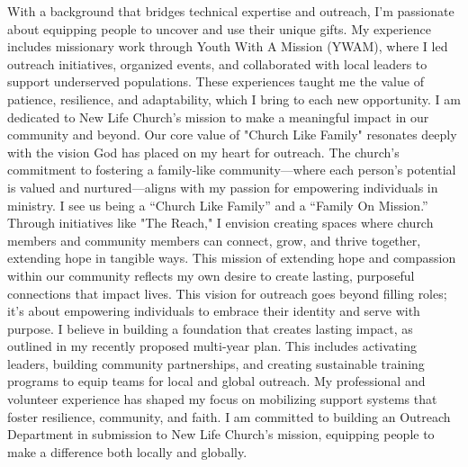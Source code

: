 \documentclass[11pt, a4paper]{awesome-cv}
\begin{document}
\makecvheader[C]


\makelettertitle

\begin{cvletter}
With a background that bridges technical expertise and outreach, I’m passionate about equipping people to uncover and use their unique gifts. My experience includes missionary work through Youth With A Mission (YWAM), where I led outreach initiatives, organized events, and collaborated with local leaders to support underserved populations. These experiences taught me the value of patience, resilience, and adaptability, which I bring to each new opportunity. I am dedicated to New Life Church’s mission to make a meaningful impact in our community and beyond.
Our core value of "Church Like Family" resonates deeply with the vision God has placed on my heart for outreach. The church’s commitment to fostering a family-like community—where each person’s potential is valued and nurtured—aligns with my passion for empowering individuals in ministry. I see us being a “Church Like Family” and a “Family On Mission.” Through initiatives like "The Reach," I envision creating spaces where church members and community members can connect, grow, and thrive together, extending hope in tangible ways. This mission of extending hope and compassion within our community reflects my own desire to create lasting, purposeful connections that impact lives.
This vision for outreach goes beyond filling roles; it’s about empowering individuals to embrace their identity and serve with purpose. I believe in building a foundation that creates lasting impact, as outlined in my recently proposed multi-year plan. This includes activating leaders, building community partnerships, and creating sustainable training programs to equip teams for local and global outreach. My professional and volunteer experience has shaped my focus on mobilizing support systems that foster resilience, community, and faith. I am committed to building an Outreach Department in submission to New Life Church’s mission, equipping people to make a difference both locally and globally.







\end{cvletter}


\makeletterclosing
\end{document}
